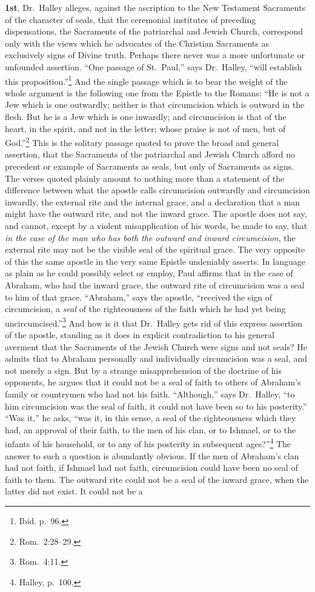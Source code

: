 \documentclass[
  english,
]{book}
\begin{document}
\textbf{1st}, Dr.~Halley alleges, against the ascription to the New Testament Sacraments of the character of seals, that the ceremonial institutes of preceding dispensations, the Sacraments of the patriarchal and Jewish Church, correspond only with the views which he advocates of the Christian Sacraments as exclusively signs of Divine truth. Perhaps there never was a more unfortunate or unfounded assertion. ``One passage of St.~Paul,'' says Dr.~Halley, ``will establish this proposition.''\footnote{Ibid. p.~96.} And the single passage which is to bear the weight of the whole argument is the following one from the Epistle to the Romans: ``He is not a Jew which is one outwardly; neither is that circumcision which is outward in the flesh. But he is a Jew which is one inwardly; and circumcision is that of the heart, in the spirit, and not in the letter; whose praise is not of men, but of God.''\footnote{Rom.~2:28--29.} This is the solitary passage quoted to prove the broad and general assertion, that the Sacraments of the patriarchal and Jewish Church afford no precedent or example of Sacraments as seals, but only of Sacraments as signs. The verses quoted plainly amount to nothing more than a statement of the difference between what the apostle calls circumcision outwardly and circumcision inwardly, the external rite and the internal grace, and a declaration that a man might have the outward rite, and not the inward grace. The apostle does not say, and cannot, except by a violent misapplication of his words, be made to say, that \emph{in the case of the man who has both the outward and inward circumcision}, the external rite may not be the visible seal of the spiritual grace. The very opposite of this the same apostle in the very same Epistle undeniably asserts. In language as plain as he could possibly select or employ, Paul affirms that in the case of Abraham, who had the inward grace, the outward rite of circumcision was a seal to him of that grace. ``Abraham,'' says the apostle, ``received the sign of circumcision, a \emph{seal} of the righteousness of the faith which he had yet being uncircumcised.''\footnote{Rom.~4:11.} And how is it that Dr.~Halley gets rid of this express assertion of the apostle, standing as it does in explicit contradiction to his general averment that the Sacraments of the Jewish Church were signs and not seals? He admits that to Abraham personally and individually circumcision was a seal, and not merely a sign. But by a strange misapprehension of the doctrine of his opponents, he argues that it could not be a seal of faith to others of Abraham's family or countrymen who had not his faith. ``Although,'' says Dr.~Halley, ``to him circumcision was the seal of faith, it could not have been so to his posterity.'' ``Was it,'' he asks, ``was it, in this sense, a seal of the righteousness which they had, an approval of their faith, to the men of his clan, or to Ishmael, or to the infants of his household, or to any of his posterity in subsequent ages?''\footnote{Halley, p.~100.} The answer to such a question is abundantly obvious. If the men of Abraham's clan had not faith, if Ishmael had not faith, circumcision could have been no seal of faith to them. The outward rite could not be a seal of the inward grace, when the latter did not exist. It could not be a 
\end{document}
